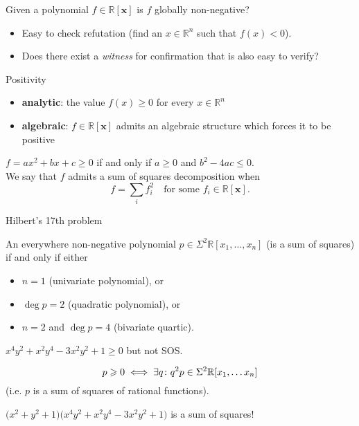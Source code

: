 \begin{frame}[standout]
   Given a polynomial $f \in \mathbb{R}[\mathbf{x}]$ is $f$ globally non-negative?
   \pause
   \begin{itemize}
      \item Easy to check refutation (find an $x\in \mathbb{R}^n$ such that $f(x) < 0$).
      \item Does there exist a \textit{witness} for confirmation that is also easy to verify?
   \end{itemize}
\end{frame}



\begin{frame}{Positivity}
   \begin{itemize}
      \item \textbf{analytic}: the value $f(x) \geqslant 0 $ for every $x \in \mathbb{R}^n$
      \item \textbf{algebraic}: $f\in \mathbb{R}[\mathbf{x}]$ admits an algebraic structure which forces it to be positive
   \end{itemize}

   \pause
   $f = ax^2 + bx + c \geqslant 0$ if and only if $a \geqslant 0$ and $b^2 - 4ac \leqslant 0$.
   \pause
\\
   We say that $f$ admits a sum of squares decomposition when
   \[
    f = \sum_i f_i^2\quad \text{for some } f_i \in \mathbb{R}[\mathbf{x}].
   \]
\end{frame}

\begin{frame}{Hilbert's 17th problem}

\begin{theorem}[Hilbert, 1888]
  An everywhere non-negative polynomial $p\in \Sigma^2\mathbb{R}[x_1,\ldots, x_n]$ (is a sum of squares) if and only if either
  \begin{itemize}
    \item $n = 1$ (univariate polynomial), or
    \item $\operatorname{deg}p = 2$ (quadratic polynomial), or
    \item $n = 2$ and $\operatorname{deg}p = 4$ (bivariate quartic).
  \end{itemize}

\end{theorem}
\pause
\begin{example}[Motzkin, 1967]
  $x^4y^2 + x^2y^4 - 3 x^2y^2 + 1 \geqslant 0$ but not SOS.
\end{example}
\pause
\begin{theorem}[Artin, 1924]
  \[p \geqslant 0 \iff \exists q\colon q^2 p \in \Sigma^2\mathbb{R}[x_1, \ldots x_n]\]
  (i.e. $p$ is a sum of squares of rational functions).
\end{theorem}

\pause
\begin{example}
  $\Big( x^2 + y^2 + 1\Big)\Big(x^4y^2 + x^2y^4 - 3 x^2y^2 + 1\Big)$ is a sum of squares!
\end{example}

\end{frame}

